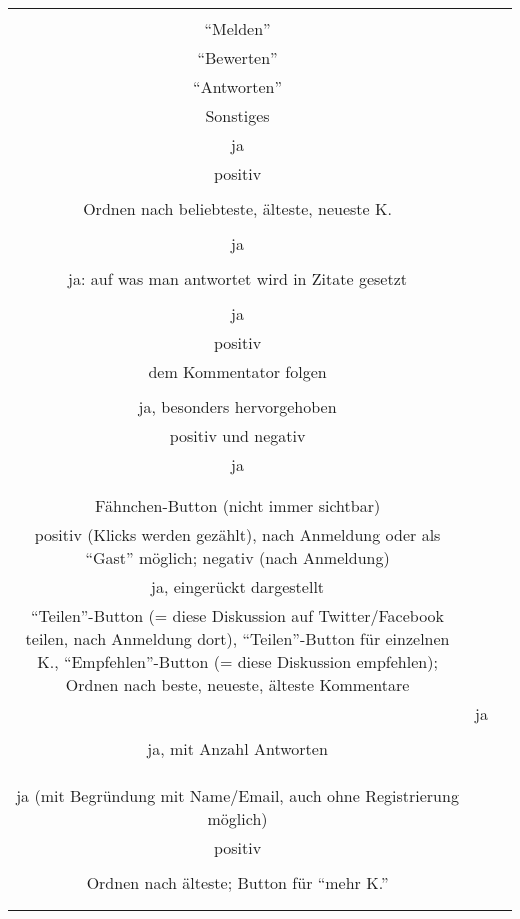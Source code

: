 \begin{landscape}
\begin{tabular}{ccc}
{		
Funktionen im Kommentar	\\
``Melden''\\
``Bewerten''\\
``Antworten''\\
Sonstiges
&		%
		\\
		ja\\
		positiv\\
		\\
		Ordnen nach beliebteste, älteste, neueste K.
		&
		\\
		\\
		ja\\
		\\
		ja: auf was man antwortet wird in Zitate gesetzt\\
		&
		\\
		ja\\
		positiv\\
		dem Kommentator folgen\\
		&
		\\
		ja, besonders hervorgehoben\\
		positiv und negativ\\
		ja\\
		\\
		&
		\\
		Fähnchen-Button (nicht immer sichtbar)\\
		positiv (Klicks werden gezählt), nach Anmeldung oder als ``Gast'' möglich; negativ (nach Anmeldung)\\
		ja, eingerückt dargestellt\\
		``Teilen''-Button (= diese Diskussion auf Twitter/Facebook teilen, nach Anmeldung dort), ``Teilen''-Button für einzelnen K., 		``Empfehlen''-Button (= diese Diskussion empfehlen); Ordnen nach beste, neueste, älteste Kommentare\\
		&
		ja\\
		\\
		ja, mit Anzahl Antworten\\
		\\
		\\
		&
		\\
		ja (mit Begründung mit Name/Email, auch ohne Registrierung möglich)\\
		positiv\\
		\\
		Ordnen nach älteste; Button für ``mehr K.''\\
		\\
}
\end{tabular}
\end{landscape}
